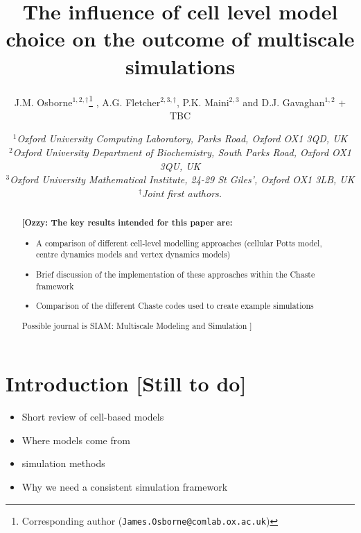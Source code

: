 \documentclass[a4paper,12pt]{article}
\newcommand{\tostart}{[Still to do]}
\newcommand{\authornote}[2]{{\bf [#1: #2]}}
\newcommand{\ozzy}[1]{\authornote{Ozzy}{#1}}
\begin{document}
\title{The influence of cell level model choice on the outcome of multiscale simulations}
\author{J.M. Osborne$^{1,2,\dagger}$\footnote{Corresponding author ({\tt James.Osborne@comlab.ox.ac.uk})} ,
A.G. Fletcher$^{2,3,\dagger}$,  
P.K. Maini$^{2,3}$ and D.J. Gavaghan$^{1,2}$ + TBC}
\date{{\small 
\textit{$^{1}$Oxford University Computing Laboratory, Parks Road, Oxford OX1 3QD, UK}\\
\textit{$^{2}$Oxford University Department of Biochemistry, South Parks Road, Oxford OX1 3QU, UK}\\
\textit{$^{3}$Oxford University Mathematical Institute, 24-29 St Giles', Oxford OX1 3LB, UK}\\
\textit{$^{\dagger}$Joint first authors.}}}
\maketitle


\begin{abstract}
\ozzy{The key results intended for this paper are:
\begin{itemize}
\item{A comparison of different cell-level modelling approaches (cellular Potts model, 
centre dynamics models and vertex dynamics models)}
\item{Brief discussion of the implementation of these approaches within the Chaste framework}
\item{Comparison of the different Chaste codes used to create example simulations}
\end{itemize}

Possible journal is SIAM: Multiscale Modeling and Simulation 
}

\end{abstract}
\clearpage


\tableofcontents
\clearpage

\section{Introduction \tostart} \label{sec1}

\begin{itemize}
\item Short review of cell-based models 
\item Where models come from 
\item simulation methods
\item Why we need a consistent simulation framework
\end{itemize}
\end{document}

